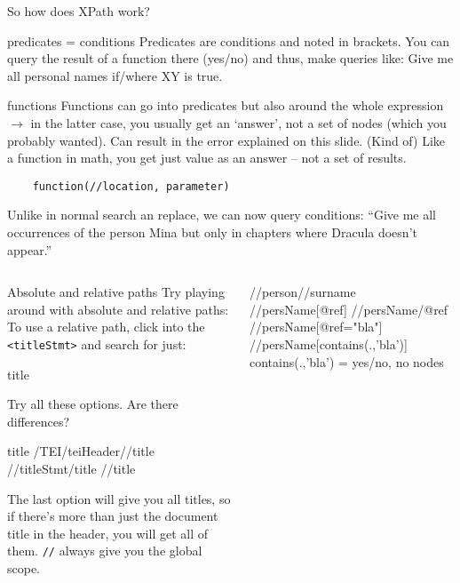 \begin{frame}{So how does XPath work?}
\framebreak

\begin{block}{predicates \lbrack{}\rbrack{} = conditions}\footnotesize
Predicates are conditions and noted \lbrack{}in brackets\rbrack{}. You can query the result of a function there (yes/no) and thus, make queries like: Give me all personal names if/where XY is true. 
\end{block}

\begin{block}{functions}\footnotesize
Functions can go into predicates but also around the whole expression $\to$ in the latter case, you usually get an `answer', not a set of nodes (which you probably wanted). Can result in the error explained on this slide. 
(Kind of) Like a function in math, you get just value as an answer -- not a set of results.
\begin{verbatim}
    function(//location, parameter)
\end{verbatim}
\end{block}

\small Unlike in normal search an replace, we can now query conditions:
``Give me all occurrences of the person Mina but only in chapters where Dracula doesn't appear.''

\framebreak

\begin{columns}
\begin{block}{Absolute and relative paths}\footnotesize
Try playing around with absolute and relative paths: To use a relative path, click into the \texttt{<titleStmt>} and search for just:
\begin{xmlcode}
title
\end{xmlcode}

Try all these options. Are there differences?
\begin{xmlcode}
title
/TEI/teiHeader//title
//titleStmt/title
//title
\end{xmlcode}
The last option will give you all titles, so if there's more than just the document title in the header, you will get all of them. \texttt{//} always give you the global scope.
\end{block}

\begin{xmlcode}
//person//surname
//persName[@ref]
//persName/@ref
//persName[@ref="bla"]
//persName[contains(.,'bla')]
contains(.,'bla') = yes/no, no nodes
\end{xmlcode}


\end{columns}
\end{frame}
